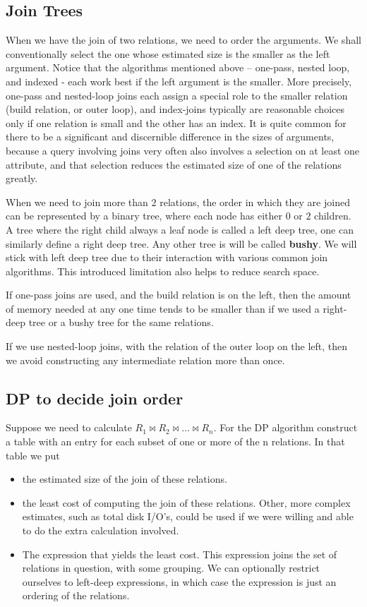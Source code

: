 \subsection{Join Trees}
When we have the join of two relations, we need to order the arguments. We shall conventionally select the one whose estimated size is the smaller as the left argument. Notice that the algorithms mentioned above -- one-pass, nested­ loop, and indexed - each work best if the left argument is the smaller. More precisely, one-pass and nested-loop joins each assign a special role to the smaller relation (build relation, or outer loop), and index-joins typically are reasonable choices only if one relation is small and the other has an index. It is quite common for there to be a significant and discernible difference in the sizes of arguments, because a query involving joins very often also involves a selection on at least one attribute, and that selection reduces the estimated size of one of the relations greatly.
\par When we need to join more than $2$ relations, the order in which they are joined can be represented by a binary tree, where each node has either $0$ or $2$ children. A tree where the right child always a leaf node is called a left deep tree, one can similarly define a right deep tree. Any other tree is will be called \textbf{bushy}. We will stick with left deep tree due to their interaction with various common join algorithms. This introduced limitation also helps to reduce search space.
\par If one-pass joins are used, and the build relation is on the left, then the amount of memory needed at any one time tends to be smaller than if we used a right-deep tree or a bushy tree for the same relations.
\par If we use nested-loop joins, with the relation of the outer loop on the left, then we avoid constructing any intermediate relation more than once.

\subsection{DP to decide join order}
Suppose we need to calculate $R_1 \bowtie R_2 \bowtie ... \bowtie R_n$. For the DP algorithm construct a table with an entry for each subset of one or more of the n relations. In that table we put 
\begin{itemize}
    \item the estimated size of the join of these relations.
    \item the least cost of computing the join of these relations. Other, more complex estimates, such as total disk I/O's, could be used if we were willing and able to do the extra calculation involved.
    \item The expression that yields the least cost. This expression joins the set of relations in question, with some grouping. We can optionally restrict ourselves to left-deep expressions, in which case the expression is just an ordering of the relations.
\end{itemize}

